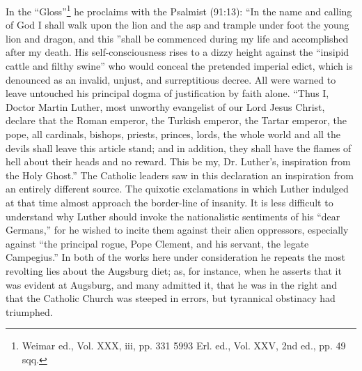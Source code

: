 In the “Gloss”\footnote{Weimar ed., Vol. XXX, iii, pp. 331 5993 Erl. ed., Vol.
XXV, 2nd ed., pp. 49 sqq.}
he proclaims with the Psalmist (91:13): “In
the name and calling of God I shall walk upon the lion and the asp
and trample under foot the young lion and dragon, and this ”shall
be commenced during my life and accomplished after my death. His
self-consciousness rises to a dizzy height against the “insipid cattle
and filthy swine” who would conceal the pretended imperial edict,
which is denounced as an invalid, unjust, and surreptitious decree.
All were warned to leave untouched his principal dogma of justification
by faith alone. “Thus I, Doctor Martin Luther, most unworthy
evangelist of our Lord Jesus Christ, declare that the Roman emperor,
the Turkish emperor, the Tartar emperor, the pope, all cardinals,
bishops, priests, princes, lords, the whole world and all the devils shall
leave this article stand; and in addition, they shall have the flames of
hell about their heads and no reward. This be my, Dr. Luther’s, inspiration
from the Holy Ghost.” The Catholic leaders saw in this
declaration an inspiration from an entirely different source. The
quixotic exclamations in which Luther indulged at that time almost
approach the border-line of insanity. It is less difficult to understand
why Luther should invoke the nationalistic sentiments of his “dear
Germans,” for he wished to incite them against their alien oppressors,
especially against “the principal rogue, Pope Clement, and his
servant, the legate Campegius.” In both of the works here under
consideration he repeats the most revolting lies about the Augsburg
diet; as, for instance, when he asserts that it was evident at Augsburg,
and many admitted it, that he was in the right and that the
Catholic Church was steeped in errors, but tyrannical obstinacy had
triumphed.

